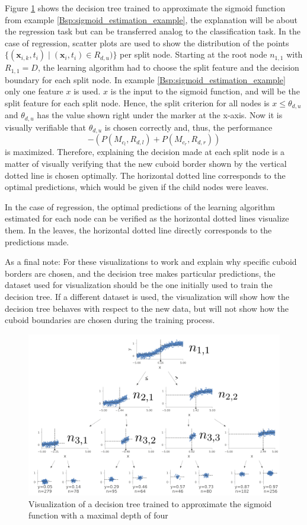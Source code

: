     Figure \ref{fig:sigmoid_dtree} shows the decision tree trained to approximate the sigmoid function from example \ref{Bsp:sigmoid_estimation_example}, the explanation will be about the regression task but can be transferred analog to the classification task.
    In the case of regression, scatter plots are used to show the distribution of the points $\{(\mathbf{x}_{i,k},t_i) \mid (\mathbf{x}_i,t_i) \in R_{d,u})\}$ per split node.
    Starting at the root node $n_{1,1}$ with $R_{1,1} = D$, the learning algorithm had to choose the split feature and the decision boundary for each split node. In example \ref{Bsp:sigmoid_estimation_example} only one feature $x$ is used. $x$ is the input to the sigmoid function, and will be the split feature for each split node. Hence, the split criterion for all nodes is $x \leq \theta_{d,u}$ and $\theta_{d,u}$ has the value shown right under the marker at the x-axis.
    Now it is visually verifiable that $\theta_{d,u}$ is chosen correctly and, thus, the performance
    \[- (P(M_{c_l}, R_{d,l}) + P(M_{c_r}, R_{d,r}))\] is maximized. Therefore, explaining the decision made at each split node is a matter of visually verifying that the new cuboid border shown by the vertical dotted line is chosen optimally. The horizontal dotted line corresponds to the optimal predictions, which would be given if the child nodes were leaves.
    
    In the case of regression, the optimal predictions of the learning algorithm estimated for each node can be verified as the horizontal dotted lines visualize them. In the leaves, the horizontal dotted line directly corresponds to the predictions made. 
    
    As a final note: For these visualizations to work and explain why specific cuboid borders are chosen, and the decision tree makes particular predictions, the dataset used for visualization should be the one initially used to train the decision tree. If a different dataset is used, the visualization will show how the decision tree behaves with respect to the new data, but will not show how the cuboid boundaries are chosen during the training process.
    
    \begin{figure}
        \centering
        \includegraphics[width=12cm]{images/ml_basics/sigmoid_dtree.png}
        \caption{Visualization of a decision tree trained to approximate the sigmoid function with a maximal depth of four}
        \label{fig:sigmoid_dtree}
    \end{figure}